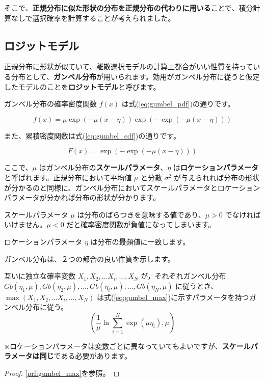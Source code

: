 そこで、\textbf{正規分布に似た形状の分布を正規分布の代わりに用いる}ことで、積分計算なしで選択確率を計算することが考えられました。

\subsection{ロジットモデル}\label{ssec:logit}

正規分布に形状が似ていて、離散選択モデルの計算上都合がいい性質を持っている分布として、\textbf{ガンベル分布}が用いられます。効用がガンベル分布に従うと仮定したモデルのことを\textbf{ロジットモデル}と呼びます。

ガンベル分布の確率密度関数 $f(x)$ は式(\ref{eq:gumbel_pdf})の通りです。

\begin{equation}
    \label{eq:gumbel_pdf}
    f(x) = \mu \exp(-\mu (x-\eta)) \exp(-\exp(-\mu (x-\eta)))
\end{equation}

また、累積密度関数は式(\ref{eq:gumbel_cdf})の通りです。

\begin{equation}
    \label{eq:gumbel_cdf}
    F(x) = \exp(-\exp(-\mu (x-\eta)))
\end{equation}

ここで、$\mu$ はガンベル分布の\textbf{スケールパラメータ}、$\eta$ は\textbf{ロケーションパラメータ}と呼ばれます。正規分布において平均値 $\mu$ と分散 $\sigma^2$ が与えられれば分布の形状が分かるのと同様に、ガンベル分布においてスケールパラメータとロケーションパラメータが分かれば分布の形状が分かります。

スケールパラメータ $\mu$ は分布のばらつきを意味する値であり、$\mu>0$ でなければいけません。$\mu<0$ だと確率密度関数が負値になってしまいます。

ロケーションパラメータ $\eta$ は分布の最頻値に一致します。

ガンベル分布は、２つの都合の良い性質を示します。

\begin{theorem}
    \label{it:gumbel_max}
    互いに独立な確率変数 $X_1,X_2, \ldots X_i, \ldots, X_N$ が，それぞれガンベル分布\mbox{}\\ $Gb(\eta_1, \mu), Gb(\eta_2, \mu),\ldots,Gb(\eta_i, \mu),\ldots,Gb(\eta_N, \mu)$ に従うとき、$\max(X_1,X_2, \ldots X_i, \ldots, X_N)$ は式(\ref{eq:gumbel_max})に示すパラメータを持つガンベル分布に従う。
    \begin{equation}
        \label{eq:gumbel_max}
        \left(\frac{1}{\mu} \ln\sum_{i=1}^N \exp(\mu\eta_i), \mu\right)
    \end{equation}

    ※ロケーションパラメータは変数ごとに異なっていてもよいですが、\textbf{スケールパラメータは同じ}である必要があります。
\end{theorem}
\begin{proof}
    \ref{prf:gumbel_max}を参照。
\end{proof}


